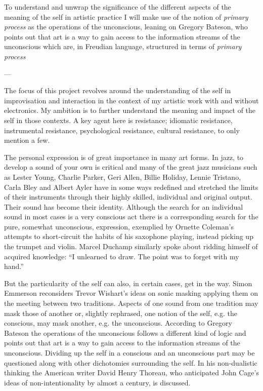 \documentclass[a4paper]{article}
\begin{document}
To understand and unwrap the significance of the different aspects of the meaning of the self in artistic practice I will make use of the notion of \emph{primary process} as the operations of the unconscious, leaning on Gregory Bateson, who points out that art is a way to gain access to the information streams of the unconscious which are, in Freudian language, structured in terms of \emph{primary process}


---


The focus of this project revolves around the understanding of the self in improvisation and interaction in the context of my artistic work with and without electronics. My ambition is to further understand the meaning and impact of the self in those contexts. A key agent here is resistance; idiomatic resistance, instrumental resistance, psychological resistance, cultural resistance, to only mention a few.

The personal expression is of great importance in many art forms.  In jazz, to develop a sound of your own is critical and many of the great jazz musicians such as Lester Young, Charlie Parker, Geri Allen, Billie Holiday, Lennie Tristano, Carla Bley and Albert Ayler have in some ways redefined and stretched the limits of their instruments through their highly skilled, individual and original output. Their sound has become their identity. Although the search for an individual sound in most cases is a very conscious act there is a corresponding search for the pure, somewhat unconscious, expression, exemplied by Ornette Coleman's attempts to short-circuit the habits of his saxophone playing, instead picking up the trumpet and violin. Marcel Duchamp similarly spoke about ridding himself of acquired knowledge: “I unlearned to draw. The point was to forget with my hand.”

But the particularity of the self can also, in certain cases, get in the way.  Simon Emmerson reconsiders Trevor Wishart's ideas on sonic masking applying them on the meeting between two traditions. Aspects of one sound from one tradition may mask those of another or, slightly rephrased, one notion of the self, e.g. the conscious, may mask another, e.g. the unconscious. According to Gregory Bateson the operations of the unconscious follows a different kind of logic and points out that art is a way to gain access to the information streams of the unconscious. Dividing up the self in a conscious and an unconscious part may be questioned along with other dichotomies surrounding the self. In his non-dualistic thinking the American writer David Henry  Thoreau, who anticipated John Cage's ideas of non-intentionality by almost a century, is discussed.
\end{document}
